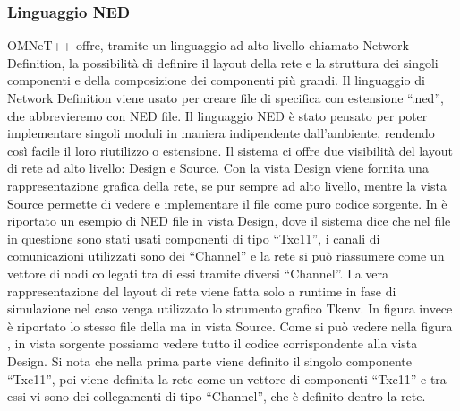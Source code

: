 \subsubsection{Linguaggio NED}
OMNeT++ offre, tramite un linguaggio ad alto livello chiamato Network Definition, la possibilità di definire il layout della rete e la struttura dei singoli componenti e della composizione dei componenti più grandi. Il linguaggio di Network Definition viene usato per creare file di specifica con estensione “.ned”, che abbrevieremo con NED file. Il linguaggio NED è stato pensato per poter implementare singoli moduli in maniera indipendente dall’ambiente, rendendo così facile il loro riutilizzo o estensione. Il sistema ci offre due visibilità del layout di rete ad alto livello: Design e Source. Con la vista Design viene fornita una rappresentazione grafica della rete, se pur sempre ad alto livello, mentre la vista Source permette di vedere e implementare il file come puro codice sorgente. In  è riportato un esempio di NED file in vista Design, dove il sistema dice che nel file in questione sono stati usati componenti di tipo “Txc11”, i canali di comunicazioni utilizzati sono dei “Channel” e la rete si può riassumere come un vettore di nodi collegati tra di essi tramite diversi “Channel”. La vera rappresentazione del layout di rete viene fatta solo a runtime in fase di simulazione nel caso venga utilizzato lo strumento grafico Tkenv. In figura  invece è riportato lo stesso file della  ma in vista Source. Come si può vedere nella figura , in vista sorgente possiamo vedere tutto il codice corrispondente alla vista Design. Si nota che nella prima parte viene definito il singolo componente “Txc11”, poi viene definita la rete come un vettore di componenti “Txc11” e tra essi vi sono dei collegamenti di tipo “Channel”, che è definito dentro la rete.
\bigskip
